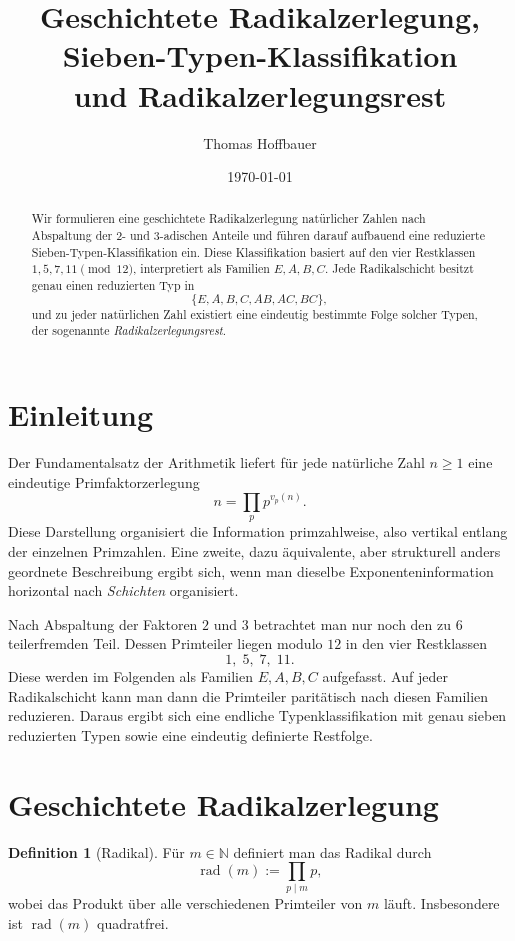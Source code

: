\documentclass[11pt,a4paper]{article}
\title{Geschichtete Radikalzerlegung, Sieben-Typen-Klassifikation\\
	und Radikalzerlegungsrest}
\author{Thomas Hoffbauer}
\date{\today}
\theoremstyle{definition}
\newtheorem{definition}[satz]{Definition}
\theoremstyle{remark}
\newcommand{\N}{\mathbb{N}}
\newcommand{\rad}{\operatorname{rad}}
\newcommand{\vp}{v_p}
\begin{document}
	\maketitle
	
	\begin{abstract}
		Wir formulieren eine geschichtete Radikalzerlegung natürlicher Zahlen nach Abspaltung der
		\(2\)- und \(3\)-adischen Anteile und führen darauf aufbauend eine reduzierte
		Sieben-Typen-Klassifikation ein. Diese Klassifikation basiert auf den vier Restklassen
		\(1,5,7,11 \pmod{12}\), interpretiert als Familien \(E,A,B,C\).
		Jede Radikalschicht besitzt genau einen reduzierten Typ in
		\[
		\{E,A,B,C,AB,AC,BC\},
		\]
		und zu jeder natürlichen Zahl existiert eine eindeutig bestimmte Folge solcher Typen,
		der sogenannte \emph{Radikalzerlegungsrest}.
	\end{abstract}
	
	\section{Einleitung}
	
	Der Fundamentalsatz der Arithmetik liefert für jede natürliche Zahl \(n\ge 1\) eine eindeutige
	Primfaktorzerlegung
	\[
	n=\prod_p p^{\vp(n)}.
	\]
	Diese Darstellung organisiert die Information primzahlweise, also vertikal entlang der einzelnen
	Primzahlen. Eine zweite, dazu äquivalente, aber strukturell anders geordnete Beschreibung ergibt
	sich, wenn man dieselbe Exponenteninformation horizontal nach \emph{Schichten} organisiert.
	
	Nach Abspaltung der Faktoren \(2\) und \(3\) betrachtet man nur noch den zu \(6\) teilerfremden Teil.
	Dessen Primteiler liegen modulo \(12\) in den vier Restklassen
	\[
	1,\;5,\;7,\;11.
	\]
	Diese werden im Folgenden als Familien \(E,A,B,C\) aufgefasst. Auf jeder Radikalschicht kann man
	dann die Primteiler paritätisch nach diesen Familien reduzieren. Daraus ergibt sich eine endliche
	Typenklassifikation mit genau sieben reduzierten Typen sowie eine eindeutig definierte Restfolge.
	
	\section{Geschichtete Radikalzerlegung}
	
	\begin{definition}[Radikal]
		Für \(m\in\N\) definiert man das Radikal durch
		\[
		\rad(m):=\prod_{p\mid m} p,
		\]
		wobei das Produkt über alle verschiedenen Primteiler von \(m\) läuft.
		Insbesondere ist \(\rad(m)\) quadratfrei.
	\end{definition}
	
\end{document}
